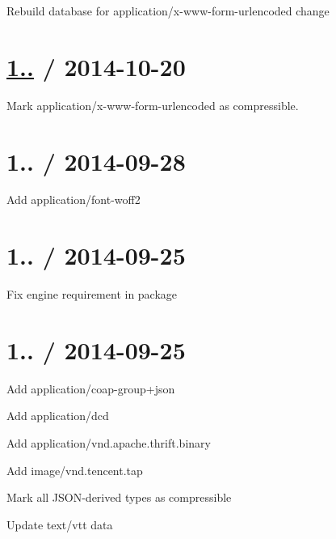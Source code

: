 \begin{DoxyItemize}
\item Rebuild database for {\ttfamily application/x-\/www-\/form-\/urlencoded} change
\end{DoxyItemize}

\section*{\hyperlink{namespace1_1_11_1_11}{1..} / 2014-\/10-\/20 }


\begin{DoxyItemize}
\item Mark {\ttfamily application/x-\/www-\/form-\/urlencoded} as compressible.
\end{DoxyItemize}

\section*{1.. / 2014-\/09-\/28 }


\begin{DoxyItemize}
\item Add {\ttfamily application/font-\/woff2}
\end{DoxyItemize}

\section*{1.. / 2014-\/09-\/25 }


\begin{DoxyItemize}
\item Fix engine requirement in package
\end{DoxyItemize}

\section*{1.. / 2014-\/09-\/25 }


\begin{DoxyItemize}
\item Add {\ttfamily application/coap-\/group+json}
\item Add {\ttfamily application/dcd}
\item Add {\ttfamily application/vnd.\+apache.\+thrift.\+binary}
\item Add {\ttfamily image/vnd.\+tencent.\+tap}
\item Mark all J\+S\+O\+N-\/derived types as compressible
\item Update {\ttfamily text/vtt} data
\end{DoxyItemize}

